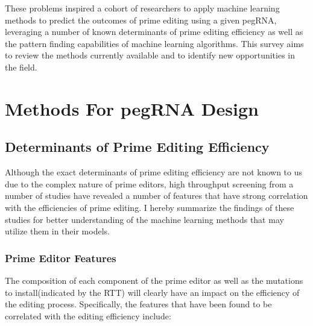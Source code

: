 \documentclass[12pt]{article}
\begin{document}
These problems inspired a cohort of researchers to apply machine learning methods to predict the outcomes of prime editing using a given pegRNA, leveraging a number of known determinants of prime editing efficiency as well as the pattern finding capabilities of machine learning algorithms. This survey aims to review the methods currently available and to identify new opportunities in the field.

\section{Methods For pegRNA Design}

\subsection{Determinants of Prime Editing Efficiency}

Although the exact determinants of prime editing efficiency are not known to us due to the complex nature of prime editors\cite{mathisPredictingPrimeEditing2023}, high throughput screening from a number of studies have revealed a number of features that have strong correlation with the efficiencies of prime editing\cite{mathisPredictingPrimeEditing2023,yuPredictionEfficienciesDiverse2023,kimPredictingEfficiencyPrime2021a,koeppelPredictionPrimeEditing2023,chenEnhancedPrimeEditing2021}. I hereby summarize the findings of these studies for better understanding of the machine learning methods that may utilize them in their models.

\subsubsection{Prime Editor Features}

The composition of each component of the prime editor as well as the mutations to install(indicated by the RTT) will clearly have an impact on the efficiency of the editing process. Specifically, the features that have been found to be correlated with the editing efficiency include:
\end{document}
